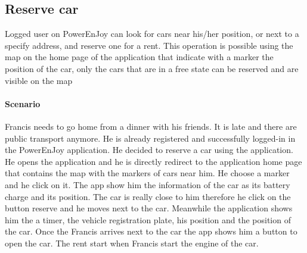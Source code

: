 \subsection{Reserve car}
Logged user on PowerEnJoy can look for cars near his/her position, or next to a specify address, and reserve one for a rent. This operation is possible using the map on the home page of the application that indicate with a marker the position of the car, only the cars that are in a free state can be reserved and are visible on the map
\paragraph{Scenario}
Francis needs to go home from a dinner with his friends. It is late and there are public transport anymore. He is already registered and successfully logged-in in the PowerEnJoy application. He decided to reserve a car using the application. He opens the application and he is directly redirect to the application home page that contains the map with the markers of cars near him. He choose a marker and he click on it. The app show him the information of the car as its battery charge and its position. The car is really close to him therefore he click on the button reserve and he moves next to the car. Meanwhile the application shows him the  a timer, the vehicle registration plate, his position and the position of the car. Once the Francis arrives next to the car the app shows him a button to open the car. The rent start when Francis start the engine of the car.
